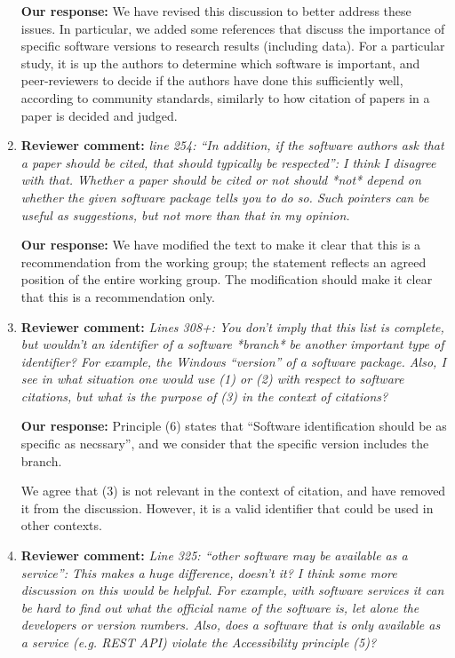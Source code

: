 \documentclass{article}
\begin{document}
\begin{enumerate}
\textbf{Our response:}
We have revised this discussion to better address these issues. In particular, we
added some references that discuss the importance of specific software versions to
research results (including data). For a particular study, it is up the authors to
determine which software is important, and peer-reviewers to decide if the authors have
done this sufficiently well, according to community standards, similarly to how citation
of papers in a paper is decided and judged.

\item \textbf{Reviewer comment:}
\emph{line 254: ``In addition, if the software authors ask that a paper should be cited, that should typically be respected'': I think I disagree with that. Whether a paper should be cited or not should *not* depend on whether the given software package tells you to do so. Such pointers can be useful as suggestions, but not more than that in my opinion.}

\textbf{Our response:}
We have modified the text to make it clear that this is a recommendation from the working group; the statement reflects an agreed position of the entire working group. The modification should make it clear that this is a recommendation only.

\item \textbf{Reviewer comment:}
\emph{Lines 308+: You don't imply that this list is complete, but wouldn't an identifier of a software *branch* be another important type of identifier? For example, the Windows ``version'' of a software package. Also, I see in what situation one would use (1) or (2) with respect to software citations, but what is the purpose of (3) in the context of citations?}

\textbf{Our response:}
Principle (6) states that ``Software identification should be as specific as necssary'', and we consider that the specific version includes the branch.

We agree that (3) is not relevant in the context of citation, and have removed it from the discussion.
However, it is a valid identifier that could be used in other contexts.

\item \textbf{Reviewer comment:}
\emph{Line 325: ``other software may be available as a service'': This makes a huge difference, doesn't it? I think some more discussion on this would be helpful. For example, with software services it can be hard to find out what the official name of the software is, let alone the developers or version numbers. Also, does a software that is only available as a service (e.g. REST API) violate the Accessibility principle (5)?}


\end{enumerate}
\end{document}
